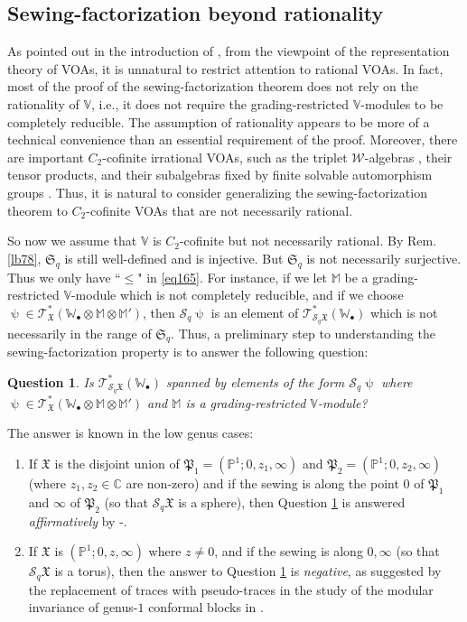 \documentclass[11pt,b5paper,notitlepage]{article}
\theoremstyle{definition}
\theoremstyle{plain}
\newtheorem{que}[df]{Question}
\newcommand{\fk}{\mathfrak}
\newcommand{\mc}{\mathcal}
\newcommand{\scr}{\mathscr}
\newcommand{\blt}{\bullet}
\newcommand{\Vbb}{\mathbb V}
\newcommand{\Wbb}{\mathbb W}
\newcommand{\Mbb}{\mathbb M}
\newcommand{\Cbb}{\mathbb C}
\newcommand{\Pbb}{\mathbb P}
\newcommand{\<}{\left\langle}
\renewcommand{\>}{\right\rangle}
\newcommand{\fx}{\mathfrak{X}}
\numberwithin{equation}{section}
\begin{document}
\subsection{Sewing-factorization beyond rationality}


As pointed out in the introduction of \cite{HLZ1}, from the viewpoint of the representation theory of VOAs, it is unnatural to restrict attention to rational VOAs. In fact, most of the proof of the sewing-factorization theorem does not rely on the rationality of $\Vbb$, i.e., it does not require the grading-restricted $\Vbb$-modules to be completely reducible. The assumption of rationality appears to be more of a technical convenience than an essential requirement of the proof. Moreover, there are important $C_2$-cofinite irrational VOAs, such as the triplet $\mc W$-algebras \cite{AM-triplet}, their tensor products, and their subalgebras fixed by finite solvable automorphism groups \cite{Miy-C2-orbifold}. Thus, it is natural to consider generalizing the sewing-factorization theorem to $C_2$-cofinite VOAs that are not necessarily rational.


So now we assume that $\Vbb$ is $C_2$-cofinite but not necessarily rational. By Rem. \ref{lb78}, $\fk S_q$ is still well-defined and is injective. But $\fk S_q$ is not necessarily surjective. Thus we only have ``$\leq$" in \eqref{eq165}. For instance, if we let $\Mbb$ be a grading-restricted $\Vbb$-module which is not completely reducible, and if we choose $\uppsi\in\scr T_{\fx}^*(\Wbb_\blt\otimes\Mbb\otimes \Mbb')$, then $\mc S_q\uppsi$ is an element of $\scr T_{\mc S_q\fx}^*(\Wbb_\blt)$ which is not necessarily in the range of $\fk S_q$. Thus, a preliminary step to understanding the sewing-factorization property is to answer the following question: 

\begin{que}\label{lb79}
Is $\scr T_{\mc S_q\fx}^*(\Wbb_\blt)$ spanned by elements of the form $\mc S_q\uppsi$ where $\uppsi\in\scr T_{\fx}^*(\Wbb_\blt\otimes\Mbb\otimes \Mbb')$ and $\Mbb$ is a grading-restricted $\Vbb$-module?
\end{que}


The answer is known in the low genus cases:
\begin{enumerate}[align=left, label=Case \arabic*.]
\item If $\fx$ is the disjoint union of $\fk P_1=(\Pbb^1;0,z_1,\infty)$ and $\fk P_2=(\Pbb^1;0,z_2,\infty)$ (where $z_1,z_2\in\Cbb$ are non-zero) and if the sewing is along the point $0$ of $\fk P_1$ and $\infty$ of $\fk P_2$ (so that $\mc S_q\fk X$ is a sphere), then Question \ref{lb79} is answered \emph{affirmatively} by \cite{HLZ1,HLZ2}-\cite{HLZ8}.
\item If $\fk X$ is $(\Pbb^1;0,z,\infty)$ where $z\neq 0$, and if the sewing is along $0,\infty$ (so that $\mc S_q\fx$ is a torus), then the answer to Question \ref{lb79} is \emph{negative}, as suggested by the replacement of traces with pseudo-traces in the study of the modular invariance of genus-$1$ conformal blocks in \cite{Miy-modular-invariance,AN-pseudo-trace,Fio-genus-1,Hua-modular-C2}.
\end{enumerate}
\end{document}
